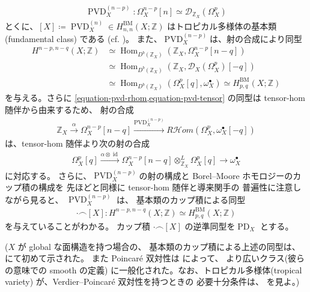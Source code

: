 \documentclass[a4paper,dvipdfmx,reqno,12pt]{amsart}
\theoremstyle{definition}
\newcommand{\deq}{\coloneqq}
\newcommand{\opn}[1]{\operatorname{#1}}
\newcommand{\xto}[1]{\xrightarrow{#1}}
\numberwithin{equation}{section}
\begin{document}
\begin{align}
\opn{PVD}^{(n-p)}_X\colon \Omega_{X}^{n-p}[n]\simeq
\mathcal{D}_{\mathbb{Z}_X}(\Omega_X^{p})
\end{align}
とくに、$[X]\deq \opn{PVD}^{(n)}_X\in H_{n,n}^{\mathrm{BM}}
(X;\mathbb{Z})$
はトロピカル多様体の基本類(fundamental class)
である (cf. \cite[Definition 4.8]{MR3894860})。
また、$\opn{PVD}^{(n-p)}_X$は、射の合成により同型
\begin{align}
H^{n-p,n-q}(X;\mathbb{Z})& \simeq
\opn{Hom}_{D^{b}(\mathbb{Z}_X)}
(\mathbb{Z}_X,\Omega_X^{n-p}[n-q]) \\
& \simeq \opn{Hom}_{D^{b}(\mathbb{Z}_X)}
(\mathbb{Z}_X,\mathcal{D}_X(\Omega_X^{p})[-q])
\label{equation-pvd-rhom} \\
& \simeq \opn{Hom}_{D^{b}(\mathbb{Z}_X)}
(\Omega_X^{p}[q],\omega_X^{\bullet})
\simeq H_{p,q}^{\mathrm{BM}}(X;\mathbb{Z})
\label{equation-pvd-tensor}
\end{align}
を与える。さらに
\cref{equation-pvd-rhom,equation-pvd-tensor}
の同型は tensor-hom 随伴から由来するため、
射の合成
\begin{align}
\mathbb{Z}_X \xto{\alpha} \Omega_X^{n-p}[n-q] 
\xto{\opn{PVD}^{(n-p)}_X} 
R\mathcal{H}om (\Omega_X^{p},\omega_X^{\bullet}[-q])
\end{align}
は、tensor-hom 随伴より次の射の合成
\begin{align}
\Omega_X^{p}[q]\xto{\alpha \otimes \opn{id}} \Omega_X^{n-p}[n-q]\otimes^{L}_{\mathbb{Z}_X}
\Omega_X^{p}[q] \to\omega_X^{\bullet}
\end{align}
に対応する。
さらに、$\opn{PVD}^{(n-p)}_X$の射の構成と
Borel--Moore ホモロジーのカップ積の構成を
先ほどと同様に tensor-hom 随伴と導来関手の
普遍性に注意しながら見ると、
$\opn{PVD}^{(n-p)}_X$ は、
基本類のカップ積による同型
\begin{align}
\label{equation-cup-pd}
\cdot \frown [X]
\colon H^{n-p,n-q}(X;\mathbb{Z})\simeq
H^{\mathrm{BM}}_{p,q}(X;\mathbb{Z})
\end{align}
を与えていることがわかる。
カップ積 $\cdot \frown [X]$
の逆準同型を$\opn{PD}_X$ とする。

($X$ が global な面構造を持つ場合の、
基本類のカップ積による上述の同型は、
\cite[Theorem 5.3]{MR3894860} にて初めて示された。
また Poincar\'e 双対性は
\cite[Theorem 1.2]{amini2021homology}によって、
より広いクラス(彼らの意味での smooth の定義)
に一般化された。なお、トロピカル多様体(tropical variety)
が、Verdier--Poincar\'e 双対性を持つときの
必要十分条件は、\cite[Theorem 6.7]{MR4637248}
を見よ。)
\end{document}
